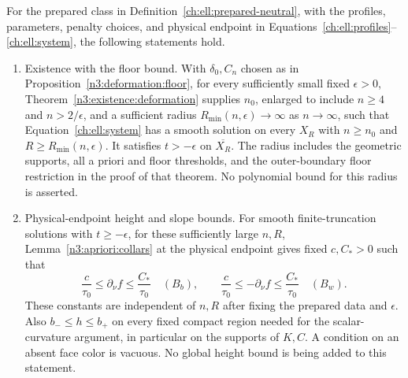 \begin{proposition}\label{ch:ell:neutral-input}
For the prepared class in Definition~\ref{ch:ell:prepared-neutral},
with the profiles, parameters, penalty choices, and physical endpoint
in Equations~\eqref{ch:ell:profiles}--\eqref{ch:ell:system}, the following
statements hold.
\begin{enumerate}
\item \textup{Existence with the floor bound.}
With $\delta_0,C_n$ chosen as in Proposition~\ref{n3:deformation:floor},
for every sufficiently small fixed $\epsilon>0$,
Theorem~\ref{n3:existence:deformation} supplies $n_0$, enlarged to include
$n\ge4$ and $n>2/\epsilon$, and a sufficient radius
$R_{\min}(n,\epsilon)\to\infty$ as $n\to\infty$, such that
Equation~\eqref{ch:ell:system} has a smooth solution on every $X_R$
with $n\ge n_0$ and $R\ge R_{\min}(n,\epsilon)$.
It satisfies $t>-\epsilon$ on $\overline{X_R}$.
The radius includes the geometric supports, all a priori and floor
thresholds, and the outer-boundary floor restriction in the proof of
that theorem.  No polynomial bound for this radius is asserted.

\item \textup{Physical-endpoint height and slope bounds.}
For smooth finite-truncation solutions with $t\ge-\epsilon$, for
these sufficiently large $n,R$, Lemma~\ref{n3:apriori:collars} at the
physical endpoint gives fixed $c,C_*>0$ such that
\begin{equation}\label{ch:ell:slopes}
 \frac c{\tau_0}\le\partial_\nu f\le\frac{C_*}{\tau_0}
       \quad(B_b),\qquad
 \frac c{\tau_0}\le-\partial_\nu f\le\frac{C_*}{\tau_0}
       \quad(B_w).
\end{equation}
These constants are independent of $n,R$ after fixing the prepared
data and $\epsilon$.  Also $b_-\le h\le b_+$ on every fixed
compact region needed for the scalar-curvature argument, in particular
on the supports of $K,C$.  A condition on an absent face color is
vacuous.  No global height bound is being added to this statement.


\end{enumerate}
\end{proposition}

